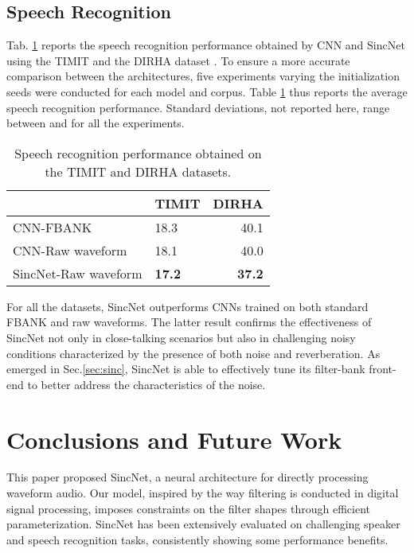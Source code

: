\documentclass{article}
\begin{document}
\subsection{Speech Recognition}
Tab. \ref{tab:asr} reports the speech recognition performance obtained by CNN and SincNet using the TIMIT and the DIRHA dataset \cite{dirha_asru}. To ensure a more accurate comparison between the architectures, five experiments varying the initialization seeds were conducted for each 
model and corpus. Table \ref{tab:asr} thus reports the average speech recognition performance. Standard deviations, not reported here, range between  and  for all the experiments.

\begin{table}[h]

\centering

\begin{tabular}{llr}  
\toprule
& TIMIT & DIRHA  \\ 
\midrule
CNN-FBANK       &   18.3      &  40.1     \\ 
CNN-Raw waveform       &   18.1     &  40.0       \\ 
SincNet-Raw waveform      &   \textbf{17.2}      &  \textbf{37.2}      \\ 
\bottomrule
\end{tabular}
\caption{Speech recognition performance obtained on the TIMIT and DIRHA datasets.}
\label{tab:asr}
\end{table}

For all the datasets, SincNet outperforms CNNs trained on both standard FBANK and raw waveforms. The latter result confirms the effectiveness of SincNet not only in close-talking scenarios but also in challenging noisy conditions characterized by the presence of both noise and reverberation. As emerged in Sec.\ref{sec:sinc},  SincNet is able to effectively tune its filter-bank front-end to better address the characteristics of the noise.        


\section{Conclusions and Future Work}
\label{sec:conc}
This paper proposed SincNet, a neural architecture for directly processing waveform audio. Our model, inspired by the way filtering is conducted in digital signal processing, imposes constraints on the filter shapes through efficient parameterization. SincNet has been extensively evaluated on challenging speaker and speech recognition tasks, consistently showing some performance benefits. 
\end{document}
